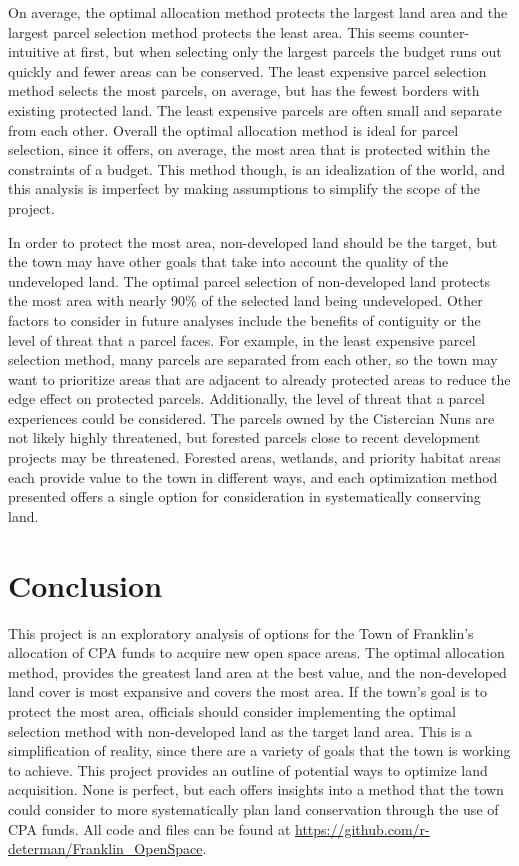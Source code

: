 \documentclass[12pt, stu, floatsintext,table]{apa7}
\begin{document}
On average, the optimal allocation method protects the largest land area and the largest parcel selection method protects the least area. This seems counter-intuitive at first, but when selecting only the largest parcels the budget runs out quickly and fewer areas can be conserved. The least expensive parcel selection method selects the most parcels, on average, but has the fewest borders with existing protected land. The least expensive parcels are often small and separate from each other.  
Overall the optimal allocation method is ideal for parcel selection, since it offers, on average, the most area that is protected within the constraints of a budget. This method though, is an idealization of the world, and this analysis is imperfect by making assumptions to simplify the scope of the project. 

In order to protect the most area, non-developed land should be the target, but the town may have other goals that take into account the quality of the undeveloped land. The optimal parcel selection of non-developed land protects the most area with nearly 90\% of the selected land being undeveloped.  Other factors to consider in future analyses include the benefits of contiguity or the level of threat that a parcel faces. For example, in the least expensive parcel selection method, many parcels are separated from each other, so the town may want to prioritize areas that are adjacent to already protected areas to reduce the edge effect on protected parcels. Additionally, the level of threat that a parcel experiences could be considered. The parcels owned by the Cistercian Nuns are not likely highly threatened, but forested parcels close to recent development projects may be threatened. Forested areas, wetlands, and priority habitat areas each provide value to the town in different ways, and each optimization method presented offers a single option for consideration in systematically conserving land. 

\section{Conclusion}
This project is an exploratory analysis of options for the Town of Franklin's allocation of CPA funds to acquire new open space areas. The optimal allocation method, provides the greatest land area at the best value, and the non-developed land cover is most expansive and covers the most area. If the town's goal is to protect the most area, officials should consider implementing the optimal selection method with non-developed land as the target land area. This is a simplification of reality, since there are a variety of goals that the town is working to achieve. This project provides an outline of potential ways to optimize land acquisition. None is perfect, but each offers insights into a method that the town could consider to more systematically plan land conservation through the use of CPA funds.  
\newline
\newline
All code and files can be found at \url{https://github.com/r-determan/Franklin_OpenSpace}. 
\newpage
\end{document}
